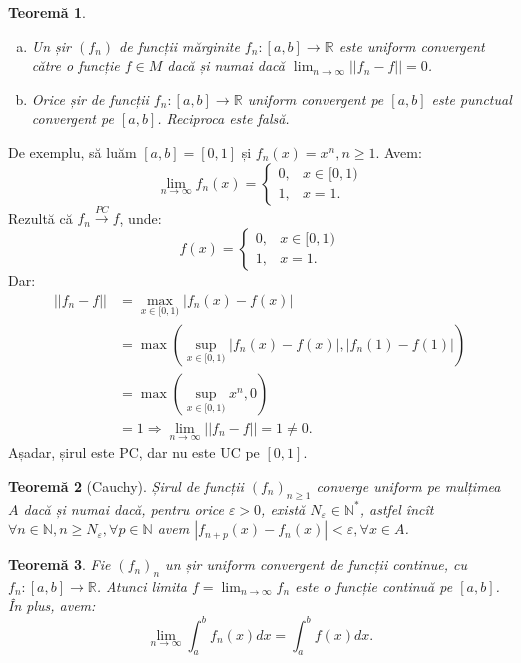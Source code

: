 \documentclass[11pt,a4paper]{article}
\newcommand\ds{\displaystyle}
\newcommand\xrar{\xrightarrow}
\newcommand\NN{\mathbb{N}}
\newcommand\RR{\mathbb{R}}
\theoremstyle{dotless}
\newtheorem{theorem}{Teorem\u{a}}[section]
\theoremstyle{dotlessdr}
\begin{document}
\begin{theorem}\label{thm:pc-uc}
  \begin{enumerate}[(a)]
  \item Un șir $(f_n)$ de funcții mărginite $f_n : [a, b] \to \RR$ este uniform
    convergent către o funcție $f \in M$ dacă și numai dacă
    $\ds\lim_{n \to \infty} ||f_n - f|| = 0$.
  \item Orice șir de funcții $f_n : [a, b] \to \RR$ uniform convergent pe $[a,b]$
    este punctual convergent pe $[a, b]$. Reciproca este falsă.
  \end{enumerate}
\end{theorem}

De exemplu, să luăm $[a, b] = [0, 1]$ și $f_n(x) = x^n, n \geq 1$. Avem:
\[
  \lim_{n \to \infty} f_n(x) = \begin{cases}
    0, & x \in [0, 1) \\
    1, & x = 1.
  \end{cases}
\]
Rezultă că $f_n \xrar{PC} f$, unde:
\[
  f(x) = \begin{cases}
    0, & x \in [0, 1) \\
    1, & x = 1.
  \end{cases}
\]
Dar:
\begin{align*}
  ||f_n - f|| &= \max_{x \in [0, 1)} |f_n(x) - f(x)| \\
              &= \max( \sup_{x \in [0, 1)} |f_n(x) - f(x)|, |f_n(1) - f(1)|) \\
              &= \max( \sup_{x \in [0, 1)} x^n, 0) \\
              &= 1 \Rightarrow \lim_{n \to \infty} ||f_n - f|| = 1 \neq 0.
\end{align*}
Așadar, șirul este PC, dar nu este UC pe $[0, 1]$.

\begin{theorem}[Cauchy]\label{thm:cauchy-UC}
  Șirul de funcții $(f_n)_{n \geq 1}$ converge uniform pe mulțimea $A$ dacă și
  numai dacă, pentru orice $\varepsilon > 0$, există $N_\varepsilon \in \NN^\ast$,
  astfel încît $\forall n \in \NN, n \geq N_\varepsilon, \forall p \in \NN$ avem
  $|f_{n + p} (x) - f_n(x)| < \varepsilon, \forall x \in A$.
\end{theorem}

\begin{theorem}\label{thm:int-uc}
  Fie $(f_n)_n$ un șir uniform convergent de funcții continue, cu $f_n : [a, b] \to \RR$.
  Atunci limita $f = \lim_{n \to \infty} f_n$ este o funcție continuă pe $[a, b]$.
  În plus, avem:
  \[
    \lim_{n \to \infty} \int_a^b f_n(x) dx = \int_a^b f(x) dx.
  \]
\end{theorem}
\end{document}
